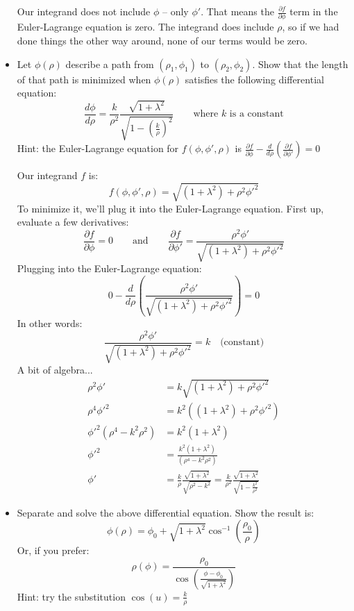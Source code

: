 \documentclass{article}
\newcommand{\purple}[1]{{\color{purple} #1}}
\begin{document}
\begin{itemize}
    \purple{
    Our integrand does not include $\phi$ -- only $\phi'$. That means the $\frac{\partial f}{\partial \phi}$ term in the Euler-Lagrange equation is zero. The integrand does include $\rho$, so if we had done things the other way around, none of our terms would be zero.
    }
    \item Let $\phi(\rho)$ describe a path from $(\rho_1, \phi_1)$ to $(\rho_2, \phi_2)$. Show that the length of that path is minimized when $\phi(\rho)$ satisfies the following differential equation:
    $$
    \frac{d\phi}{d\rho} = \frac{k}{\rho^2} \frac{\sqrt{1 + \lambda^2} }{\sqrt{1 - \left( \frac{k}{\rho} \right)^2}}
    \quad \quad 
    \text{where $k$ is a constant}
    $$
    Hint: the Euler-Lagrange equation for $f(\phi, \phi', \rho)$ is \; $\frac{\partial f}{\partial \phi} - \frac{d}{d \rho} \left( \frac{\partial f}{\partial \phi'} \right) = 0$
    
    \purple{
    Our integrand $f$ is:
    $$
    f(\phi, \phi', \rho) = \sqrt{ \left( 1 + \lambda^2 \right) + \rho^2 \phi'^2 }
    $$
    To minimize it, we'll plug it into the Euler-Lagrange equation. First up, evaluate a few derivatives:
    $$
    \frac{\partial f}{\partial \phi} = 0
    \quad \quad \text{and} \quad \quad
    \frac{\partial f}{\partial \phi'} = \frac{\rho^2 \phi'}{\sqrt{ \left( 1 + \lambda^2 \right) + \rho^2 \phi'^2 }}
    $$
    Plugging into the Euler-Lagrange equation:
    $$
    0 - \frac{d}{d\rho} \left( \frac{\rho^2 \phi'}{\sqrt{ \left( 1 + \lambda^2 \right) + \rho^2 \phi'^2 }} \right) = 0
    $$
    In other words:
    $$
    \frac{\rho^2 \phi'}{\sqrt{ \left( 1 + \lambda^2 \right) + \rho^2 \phi'^2 }} = k \quad \text{(constant)}
    $$
    A bit of algebra...
    \begin{align*}
        \rho^2 \phi' &= k \sqrt{ \left( 1 + \lambda^2 \right) + \rho^2 \phi'^2 } \\
        \rho^4 \phi'^2 &= k^2 \left( \left( 1 + \lambda^2 \right) + \rho^2 \phi'^2 \right) \\
        \phi'^2 \left( \rho^4 - k^2 \rho^2 \right) &= k^2 \left( 1 + \lambda^2 \right) \\
        \phi'^2 &= \frac{k^2 \left( 1 + \lambda^2 \right) }{\left( \rho^4 - k^2 \rho^2 \right)} \\
        \phi' &= \frac{k}{\rho} \frac{\sqrt{ 1 + \lambda^2 } }{ \sqrt{ \rho^2 - k^2 } } = \frac{k}{\rho^2} \frac{\sqrt{ 1 + \lambda^2 } }{ \sqrt{ 1 - \frac{k^2}{\rho^2} } }
    \end{align*}
    }
    
    \item Separate and solve the above differential equation. Show the result is:
    $$
    \phi(\rho) = \phi_0 + \sqrt{1 + \lambda^2} \cos^{-1} \left( \frac{\rho_0}{\rho} \right)
    $$
    Or, if you prefer:
    $$
    \rho(\phi) = \frac{\rho_0}{ \cos \left( \frac{\phi - \phi_0}{ \sqrt{1 + \lambda^2} } \right) }
    $$
    Hint: try the substitution $\cos(u) = \frac{k}{\rho}$
    

\end{itemize}
\end{document}
